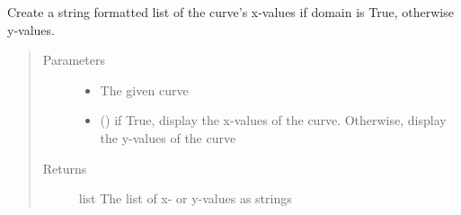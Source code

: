 \documentclass[letterpaper,10pt,english]{sphinxmanual}
\begin{document}
\begin{fulllineitems}
\label{\detokenize{pydv:pydvpy.disp}}
Create a string formatted list of the curve’s x-values if domain is True, otherwise y-values.

\begin{sphinxVerbatim}[commandchars=\\\{\}]
   
\end{sphinxVerbatim}

\begin{sphinxVerbatim}[commandchars=\\\{\}]
   
\end{sphinxVerbatim}
\begin{quote}\begin{description}
\item[{Parameters}] \leavevmode\begin{itemize}
\item {} 
 \textendash{} The given curve

\item {} 
 (\sphinxstyleliteralemphasis{\sphinxupquote{, }}) \textendash{} if True, display the x-values of the curve. Otherwise, display the y-values of the curve

\end{itemize}

\item[{Returns}] \leavevmode
list \textendash{} The list of x- or y-values as strings

\end{description}\end{quote}

\end{fulllineitems}

\end{document}

